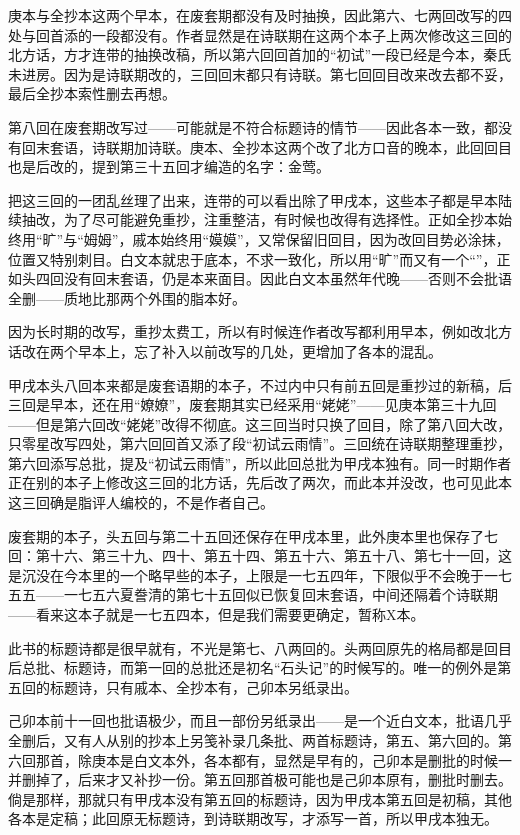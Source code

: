 \par 庚本与全抄本这两个早本，在废套期都没有及时抽换，因此第六、七两回改写的四处与回首添的一段都没有。作者显然是在诗联期在这两个本子上两次修改这三回的北方话，方才连带的抽换改稿，所以第六回回首加的“初试”一段已经是今本，秦氏未进房。因为是诗联期改的，三回回末都只有诗联。第七回回目改来改去都不妥，最后全抄本索性删去再想。
\par 第八回在废套期改写过——可能就是不符合标题诗的情节——因此各本一致，都没有回末套语，诗联期加诗联。庚本、全抄本这两个改了北方口音的晚本，此回回目也是后改的，提到第三十五回才编造的名字：金莺。
\par 把这三回的一团乱丝理了出来，连带的可以看出除了甲戌本，这些本子都是早本陆续抽改，为了尽可能避免重抄，注重整洁，有时候也改得有选择性。正如全抄本始终用“旷”与“姆姆”，戚本始终用“嫫嫫”，又常保留旧回目，因为改回目势必涂抹，位置又特别刺目。白文本就忠于底本，不求一致化，所以用“旷”而又有一个“\QuanWang ”，正如头四回没有回末套语，仍是本来面目。因此白文本虽然年代晚——否则不会批语全删——质地比那两个外围的脂本好。
\par 因为长时期的改写，重抄太费工，所以有时候连作者改写都利用早本，例如改北方话改在两个早本上，忘了补入以前改写的几处，更增加了各本的混乱。
\par 甲戌本头八回本来都是废套语期的本子，不过内中只有前五回是重抄过的新稿，后三回是早本，还在用“嫽嫽”，废套期其实已经采用“姥姥”——见庚本第三十九回——但是第六回改“姥姥”改得不彻底。这三回当时只换了回目，除了第八回大改，只零星改写四处，第六回回首又添了段“初试云雨情”。三回统在诗联期整理重抄，第六回添写总批，提及“初试云雨情”，所以此回总批为甲戌本独有。同一时期作者正在别的本子上修改这三回的北方话，先后改了两次，而此本并没改，也可见此本这三回确是脂评人编校的，不是作者自己。
\par 废套期的本子，头五回与第二十五回还保存在甲戌本里，此外庚本里也保存了七回：第十六、第三十九、四十、第五十四、第五十六、第五十八、第七十一回，这是沉没在今本里的一个略早些的本子，上限是一七五四年，下限似乎不会晚于一七五五——一七五六夏誊清的第七十五回似已恢复回末套语，中间还隔着个诗联期——看来这本子就是一七五四本，但是我们需要更确定，暂称X本。
\par 此书的标题诗都是很早就有，不光是第七、八两回的。头两回原先的格局都是回目后总批、标题诗，而第一回的总批还是初名“石头记”的时候写的。唯一的例外是第五回的标题诗，只有戚本、全抄本有，己卯本另纸录出。
\par 己卯本前十一回也批语极少，而且一部份另纸录出——是一个近白文本，批语几乎全删后，又有人从别的抄本上另笺补录几条批、两首标题诗，第五、第六回的。第六回那首，除庚本是白文本外，各本都有，显然是早有的，己卯本是删批的时候一并删掉了，后来才又补抄一份。第五回那首极可能也是己卯本原有，删批时删去。倘是那样，那就只有甲戌本没有第五回的标题诗，因为甲戌本第五回是初稿，其他各本是定稿；此回原无标题诗，到诗联期改写，才添写一首，所以甲戌本独无。
